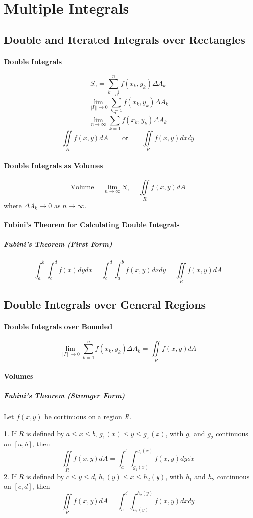\documentclass{article}
\begin{document}
    \newpage
    \section{Multiple Integrals}
        \subsection{Double and Iterated Integrals over Rectangles}
            \paragraph{Double Integrals}
                \[S_n=\sum_{k=1}^nf(x_k,y_k)\Delta A_k\]
                \[\lim\limits_{||P||\to 0}\sum_{k=1}^nf(x_k,y_k)\Delta A_k\]
                \[\lim\limits_{n\to\infty}\sum_{k=1}^nf(x_k,y_k)\Delta A_k\]
                \[\iint\limits_{R}f(x,y)dA\qquad\text{or}\qquad\iint\limits_{R}f(x,y)dxdy\]
            \paragraph{Double Integrals as Volumes}
                \[\text{Volume}=\lim\limits_{n\to\infty}S_n=\iint\limits_{R}f(x,y)dA\]
                where $\Delta A_k\to 0$ as $n\to\infty$.
            \paragraph{Fubini's Theorem for Calculating Double Integrals}
                \subparagraph{Fubini's Theorem (First Form)}
                \[\int_a^b\int_c^df(x)dydx=\int_c^d\int_a^bf(x,y)dxdy=\iint\limits_Rf(x,y)dA\]
        \subsection{Double Integrals over General Regions}
            \paragraph{Double Integrals over Bounded}
                \[\lim\limits_{||P||\to 0}\sum_{k=1}^nf(x_k,y_k)\Delta A_k=\iint\limits_Rf(x,y)dA\]
            \paragraph{Volumes}
                \subparagraph{Fubini's Theorem (Stronger Form)} Let $f(x,y)$ be continuous on a region $R$.\\
                \par 1. If $R$ is defined by $a\le x\le b$, $g_1(x)\le y\le g_x(x)$, with $g_1$ and $g_2$ continuous on $[a,b]$, then
                \[\iint\limits_Rf(x,y)dA=\int_a^b\int_{g_1(x)}^{g_2(x)}f(x,y)dydx\]
                2. If $R$ is defined by $c\le y\le d$, $h_1(y)\le x\le h_2(y)$, with $h_1$ and $h_2$ continuous on $[c,d]$, then
                \[\iint\limits_{R}f(x,y)dA=\int_c^d\int_{h_1(y)}^{h_2(y)}f(x,y)dxdy\]
\end{document}
